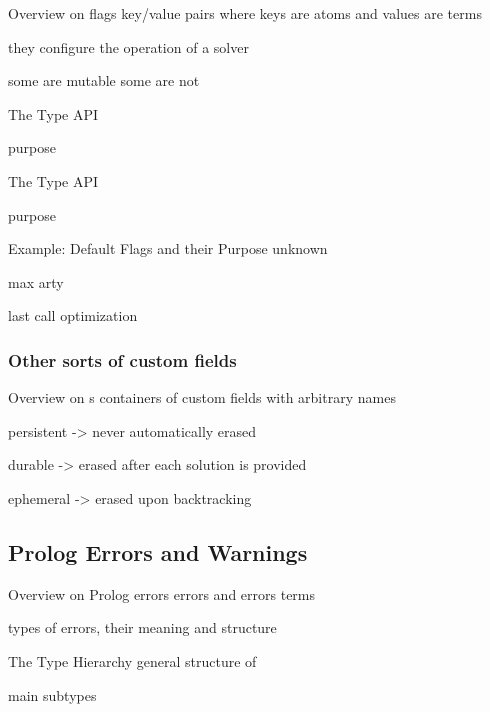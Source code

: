 \documentclass[handout]{beamer}
\begin{document}
\begin{frame}[allowframebreaks]{Overview on flags}
    key/value pairs where keys are atoms and values are terms

    they configure the operation of a solver

    some are mutable some are not
\end{frame}

\begin{frame}[allowframebreaks]{The  Type}
    API

    purpose
\end{frame}

\begin{frame}[allowframebreaks]{The  Type}
    API

    purpose
\end{frame}

\begin{frame}[allowframebreaks]{Example: Default Flags and their Purpose}
    unknown

    max arty

    last call optimization
\end{frame}

\subsubsection{Other sorts of custom fields}

\begin{frame}[allowframebreaks]{Overview on s}
    containers of custom fields with arbitrary names

    persistent -> never automatically erased

    durable -> erased after each solution is provided

    ephemeral -> erased upon backtracking
\end{frame}

\subsection{Prolog Errors and Warnings}

\begin{frame}[allowframebreaks]{Overview on Prolog errors}
    errors and errors terms

    types of errors, their meaning and structure
\end{frame}

\begin{frame}[allowframebreaks]{The  Type Hierarchy}
    general structure of 

    main subtypes
\end{frame}
\end{document}
